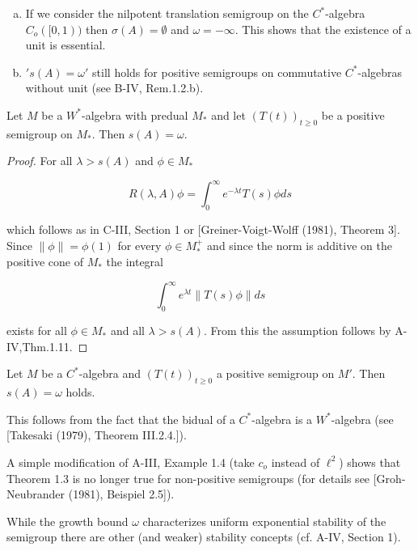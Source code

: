 \newpage

\begin{remark}\label{rem:d4-1-2}
\begin{enumerate}[(a)]
\item
If we consider the nilpotent translation semigroup on the $C^*$-algebra $C_{o}([0,1))$ then $\sigma(A) = \emptyset$ and $\omega = -\infty$.
This shows that the existence of a unit is essential.

\item
$'s(A) = \omega'$ still holds for positive semigroups on commutative $C^*$-algebras without unit (see B-IV, Rem.1.2.b).
\end{enumerate}
\end{remark}

\begin{theorem}\label{thm:d4-1-3}
Let $M$ be a $W^*$-algebra with predual $M_{*}$ and let $(T(t))_{t \geq 0}$ be a positive semigroup on $M_{*}$.
Then $s(A) = \omega$.
\end{theorem}

\begin{proof}
For all $\lambda > s(A)$ and $\phi \in M_{*}$

\[
R(\lambda,A)\phi = \int_{0}^{\infty} e^{-\lambda t}T(s)\phi ds
\]

which follows as in C-III, Section 1 or [Greiner-Voigt-Wolff (1981), Theorem 3].
Since $\|\phi\| = \phi(1)$ for every $\phi \in M_{*}^{+}$ and since the norm is additive on the positive cone of $M_{*}$ the integral

\[
\int_{0}^{\infty} e^{\lambda t}\|T(s)\phi\|ds
\]

exists for all $\phi \in M_{*}$ and all $\lambda > s(A)$.
From this the assumption follows by A-IV,Thm.1.11.
\end{proof}

\begin{corollary}\label{cor:d4-1-4}
Let $M$ be a $C^*$-algebra and $(T(t))_{t \geq 0}$ a positive semigroup on $M'$.
Then $s(A) = \omega$ holds.
\end{corollary}

This follows from the fact that the bidual of a $C^*$-algebra is a $W^*$-algebra (see [Takesaki (1979), Theorem III.2.4.]).

\begin{remark}\label{rem:d4-1-5}
A simple modification of A-III, Example 1.4 (take $c_{o}$ instead of $\ell^2$) shows that Theorem 1.3 is no longer true for non-positive semigroups (for details see [Groh-Neubrander (1981), Beispiel 2.5]).

While the growth bound $\omega$ characterizes uniform exponential stability of the semigroup there are other (and weaker) stability concepts (cf. A-IV, Section 1).
\end{remark}


